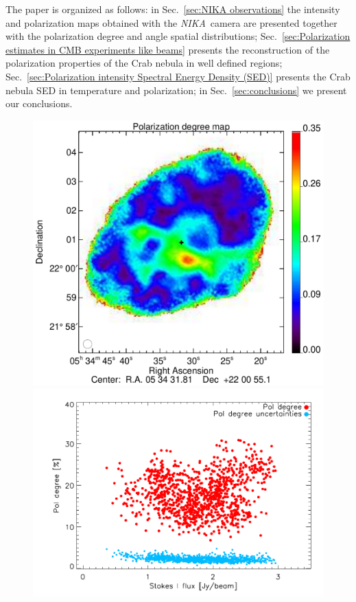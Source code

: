 \documentclass[twocolumn,traditabstract]{aa}
\def\NIKA{\textit{NIKA}}
\begin{document}
The paper is organized as follows: in Sec.~\ref{sec:NIKA observations} the
intensity and polarization maps obtained with the \NIKA\ camera are presented
together with the polarization degree and angle spatial distributions;
Sec.~\ref{sec:Polarization estimates in CMB experiments like beams} presents the
reconstruction of the polarization properties of the Crab nebula in well defined
regions; Sec.~\ref{sec:Polarization intensity Spectral Energy Density (SED)}
presents the Crab nebula SED in temperature and polarization; in
Sec.~\ref{sec:conclusions} we present our conclusions.
 \begin{figure}
\centering
\includegraphics[clip, angle=0, scale = 0.35]{figures/Crab_pol_deg_v3.pdf}
\includegraphics[clip, angle=0, scale = 0.5]{figures/pol_deg_vs_I_2mm.pdf}

\end{figure}
\end{document}
